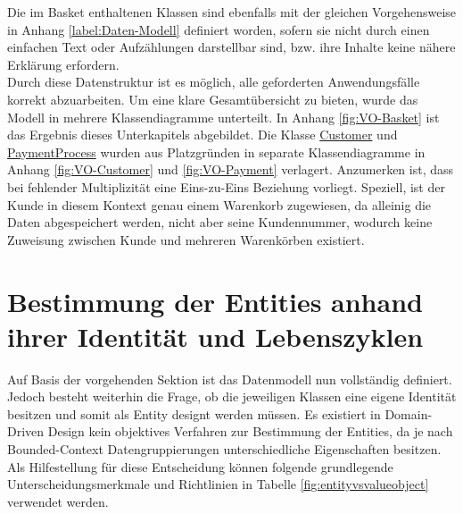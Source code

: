 
\vspace{1em}
Die im Basket enthaltenen Klassen sind ebenfalls mit der gleichen Vorgehensweise in Anhang \ref{label:Daten-Modell} definiert worden, sofern sie nicht durch einen einfachen Text oder Aufzählungen darstellbar sind, bzw. ihre Inhalte keine nähere Erklärung erfordern. \\

Durch diese Datenstruktur ist es möglich, alle geforderten Anwendungsfälle korrekt abzuarbeiten. Um eine klare Gesamtübersicht zu bieten, wurde das Modell in mehrere Klassendiagramme unterteilt. In Anhang \ref{fig:VO-Basket} ist das Ergebnis dieses Unterkapitels abgebildet. Die Klasse \ul{Customer} und \ul{PaymentProcess} wurden aus Platzgründen in separate Klassendiagramme in Anhang \ref{fig:VO-Customer} und \ref{fig:VO-Payment} verlagert. Anzumerken ist, dass bei fehlender Multiplizität eine Eins-zu-Eins Beziehung vorliegt. Speziell, ist der Kunde in diesem Kontext genau einem Warenkorb zugewiesen, da alleinig die Daten abgespeichert werden, nicht aber seine Kundennummer, wodurch keine Zuweisung zwischen Kunde und mehreren Warenkörben existiert.

\section{Bestimmung der Entities anhand ihrer Identität und Lebenszyklen}

Auf Basis der vorgehenden Sektion ist das Datenmodell nun vollständig definiert. Jedoch besteht weiterhin die Frage, ob die jeweiligen Klassen eine eigene Identität besitzen und somit als Entity designt werden müssen. Es existiert in Domain-Driven Design kein objektives Verfahren zur Bestimmung der Entities, da je nach Bounded-Context Datengruppierungen unterschiedliche Eigenschaften besitzen. Als Hilfestellung für diese Entscheidung können folgende grundlegende Unterscheidungsmerkmale und Richtlinien in Tabelle \ref{fig:entityvsvalueobject} verwendet werden.

